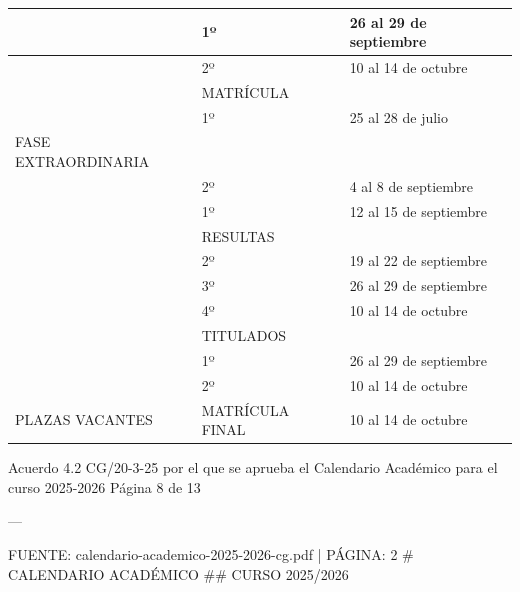 \documentclass{article}
\begin{document}
\begin{itemize}
\begin{itemize}
\begin{scriptsize}
\begin{table}[h!]
\begin{tabular}{|p{}|p{}|p{}|}
                                          & 1º                 & 26 al 29 de septiembre   \\\hline
                                          & 2º                 & 10 al 14 de octubre      \\\hline
                                          & MATRÍCULA          &                          \\\hline
                                          & 1º                 & 25 al 28 de julio        \\\hline
                      FASE EXTRAORDINARIA &                    &                          \\\hline
                                          & 2º                 & 4 al 8 de septiembre     \\\hline
                                          & 1º                 & 12 al 15 de septiembre   \\\hline
                                          & RESULTAS           &                          \\\hline
                                          & 2º                 & 19 al 22 de septiembre   \\\hline
                                          & 3º                 & 26 al 29 de septiembre   \\\hline
                                          & 4º                 & 10 al 14 de octubre      \\\hline
                                          & TITULADOS          &                          \\\hline
                                          & 1º                 & 26 al 29 de septiembre   \\\hline
                                          & 2º                 & 10 al 14 de octubre      \\\hline
                      PLAZAS VACANTES     & MATRÍCULA FINAL    & 10 al 14 de octubre      \\\hline
                    \end{tabular}\end{table}
                  \vspace{0.4cm}

                  Acuerdo 4.2 CG/20-3-25 por el que se aprueba el Calendario Académico para el curso 2025-2026  Página 8 de 13

                  ---

                  FUENTE: calendario-academico-2025-2026-cg.pdf | PÁGINA: 2
                  \# CALENDARIO ACADÉMICO
                  \#\# CURSO 2025/2026


\end{scriptsize}
\end{itemize}
\end{itemize}
\end{document}
